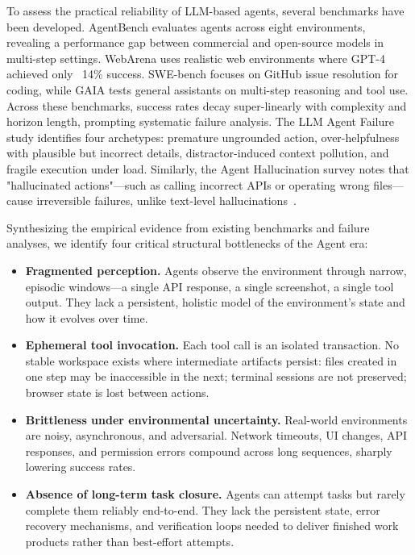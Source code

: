 To assess the practical reliability of LLM-based agents, several benchmarks have been developed. AgentBench \cite{liu2023agentbench} evaluates agents across eight environments, revealing a performance gap between commercial and open-source models in multi-step settings. WebArena \cite{zhou2023webarena} uses realistic web environments where GPT-4 achieved only ~14\% success. SWE-bench \cite{jimenez2023swebench} focuses on GitHub issue resolution for coding, while GAIA \cite{mialon2023gaia} tests general assistants on multi-step reasoning and tool use. Across these benchmarks, success rates decay super-linearly with complexity and horizon length, prompting systematic failure analysis. The LLM Agent Failure study \cite{roig2025llms} identifies four archetypes: premature ungrounded action, over-helpfulness with plausible but incorrect details, distractor-induced context pollution, and fragile execution under load. Similarly, the Agent Hallucination survey \cite{lin2025llm} notes that "hallucinated actions"—such as calling incorrect APIs or operating wrong files—cause irreversible failures, unlike text-level hallucinations~\citep{he2024webvoyager,yoran2024assistantbench,wu2024copilot,zhang2025ufo,huang2023mlagentbench, kuang2025process, ye2025productagent}.

Synthesizing the empirical evidence from existing benchmarks and failure analyses, we identify four critical structural bottlenecks of the Agent era:
\begin{itemize}
    \item \textbf{Fragmented perception.} Agents observe the environment through narrow, episodic windows---a single API response, a single screenshot, a single tool output. They lack a persistent, holistic model of the environment's state and how it evolves over time.
    \item \textbf{Ephemeral tool invocation.} Each tool call is an isolated transaction. No stable workspace exists where intermediate artifacts persist: files created in one step may be inaccessible in the next; terminal sessions are not preserved; browser state is lost between actions.
    \item \textbf{Brittleness under environmental uncertainty.} Real-world environments are noisy, asynchronous, and adversarial. Network timeouts, UI changes, API responses, and permission errors compound across long sequences, sharply lowering success rates.
    \item \textbf{Absence of long-term task closure.} Agents can attempt tasks but rarely complete them reliably end-to-end. They lack the persistent state, error recovery mechanisms, and verification loops needed to deliver finished work products rather than best-effort attempts.
\end{itemize}


